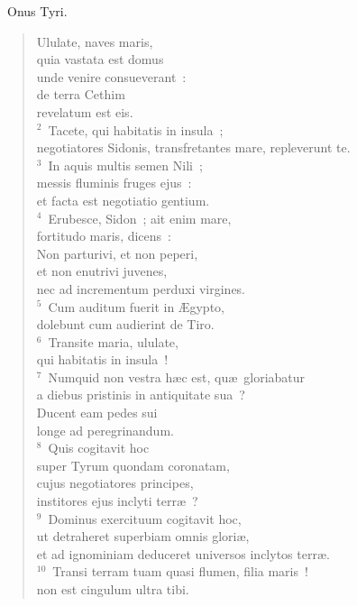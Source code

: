 ~Onus Tyri. \begin{flushleft}\begin{verse}\vspace{6pt}Ululate, naves maris,\\ quia vastata est domus\\ unde venire consueverant~:\\ de terra Cethim\\ revelatum est eis.\\
${}^{2}$~Tacete, qui habitatis in insula~;\\ negotiatores Sidonis, transfretantes mare, repleverunt te.\\
${}^{3}$~In aquis multis semen Nili~;\\ messis fluminis fruges ejus~:\\ et facta est negotiatio gentium.\\
${}^{4}$~Erubesce, Sidon~; ait enim mare,\\ fortitudo maris, dicens~:\\ Non parturivi, et non peperi,\\ et non enutrivi juvenes,\\ nec ad incrementum perduxi virgines.\\
${}^{5}$~Cum auditum fuerit in \AE gypto,\\ dolebunt cum audierint de Tiro.\\
${}^{6}$~Transite maria, ululate,\\ qui habitatis in insula~!\\
${}^{7}$~Numquid non vestra h\ae c est, qu\ae\ gloriabatur\\ a diebus pristinis in antiquitate sua~?\\ Ducent eam pedes sui\\ longe ad peregrinandum.\\
${}^{8}$~Quis cogitavit hoc\\ super Tyrum quondam coronatam,\\ cujus negotiatores principes,\\ institores ejus inclyti terr\ae~?\\
${}^{9}$~Dominus exercituum cogitavit hoc,\\ ut detraheret superbiam omnis glori\ae ,\\ et ad ignominiam deduceret universos inclytos terr\ae .\\
${}^{10}$~Transi terram tuam quasi flumen, filia maris~!\\ non est cingulum ultra tibi.\\

\end{verse}
\end{flushleft}
